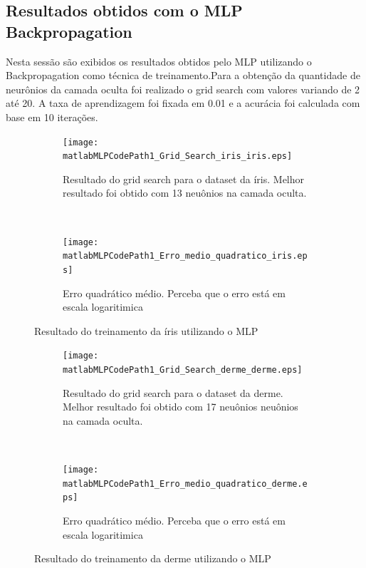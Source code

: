 \documentclass[
	article,			%
	11pt,				%
	oneside,			%
	a4paper,			%
	english,			%
	brazil,				%
	sumario=tradicional
	]{abntex2}
\newcommand{\matlabMLPCodePath}{/home/clifte/git/Mestrado/Matlab/Trabalho_RNA/trabalho2/MLP/}
\begin{document}
\subsection{Resultados obtidos com o MLP Backpropagation}
Nesta sessão são exibidos os resultados obtidos pelo MLP utilizando o
Backpropagation como técnica de treinamento.Para a obtenção da quantidade de
neurônios da camada oculta foi realizado o grid search com valores variando de 2
até 20. A taxa de aprendizagem foi fixada em 0.01 e a acurácia foi calculada com
base em 10 iterações.

\begin{figure} 
	\centering
	\begin{subfigure}[b]{0.4\textwidth}
		\texttt{[image: \\matlabMLPCodePath1\_Grid\_Search\_iris\_iris.eps]}
		\caption{Resultado do grid search para o dataset da íris. Melhor resultado foi
		obtido com 13 neuônios na camada oculta.}
	\end{subfigure}
    ~
    \begin{subfigure}[b]{0.4\textwidth}
		\texttt{[image: \\matlabMLPCodePath1\_Erro\_medio\_quadratico\_iris.eps]}
		\caption{Erro quadrático médio. Perceba que o erro está em escala
		logaritimica}
	\end{subfigure}     
  \caption{Resultado do treinamento da íris utilizando o MLP}
\end{figure}


\begin{figure} 
	\centering
	\begin{subfigure}[b]{0.4\textwidth}
		\texttt{[image: \\matlabMLPCodePath1\_Grid\_Search\_derme\_derme.eps]}
		\caption{Resultado do grid search para o dataset da derme. Melhor resultado
		foi obtido com 17 neuônios neuônios na camada oculta.}
	\end{subfigure}
    ~
    \begin{subfigure}[b]{0.4\textwidth}
		\texttt{[image: \\matlabMLPCodePath1\_Erro\_medio\_quadratico\_derme.eps]}
		\caption{Erro quadrático médio. Perceba que o erro está em escala
		logaritimica}
	\end{subfigure}     
  \caption{Resultado do treinamento da derme utilizando o MLP}
\end{figure}
\end{document}
